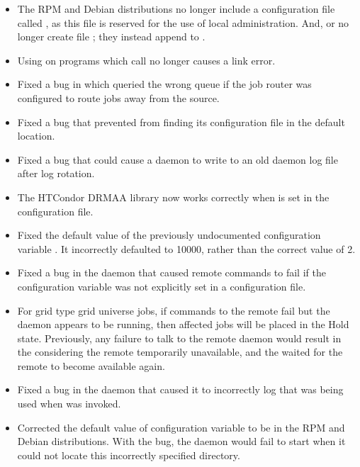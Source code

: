 \begin{itemize}
\item The RPM and Debian distributions no longer include a configuration
file called ,
as this file is reserved for the use of local administration.
And,  or  no longer create
file ; they instead append to .

\item Using  on programs which call 
no longer causes a link error.

\item Fixed a bug in which  queried the wrong queue
if the job router was configured to route jobs away from the source.

\item Fixed a bug that prevented  from finding its configuration
file in the default location.

\item Fixed a bug that could cause a daemon to write to an old daemon log
file after log rotation.

\item The HTCondor DRMAA library now works correctly when
 is set in the configuration file.

\item Fixed the default value of the previously undocumented 
configuration variable .
It incorrectly defaulted to 10000, rather than the correct value of 2.

\item Fixed a bug in the  daemon
that caused remote 
commands to fail if the configuration variable  was not 
explicitly set in a configuration file.

\item For grid type  grid universe jobs, if commands
to the remote  fail but the daemon appears to be running,
then affected jobs will be placed in the Hold state.
Previously, any failure to talk to the remote daemon would result in
the  considering the remote  
temporarily unavailable,
and the  waited for the remote 
to become available again.

\item Fixed a bug in the  daemon
that caused it to incorrectly log
that  was being used when  was invoked.

\item Corrected the default value of configuration variable
 to be
 in the RPM and Debian distributions.
With the bug,
the  daemon would fail to start
when it could not locate this incorrectly specified directory. 

\end{itemize}

